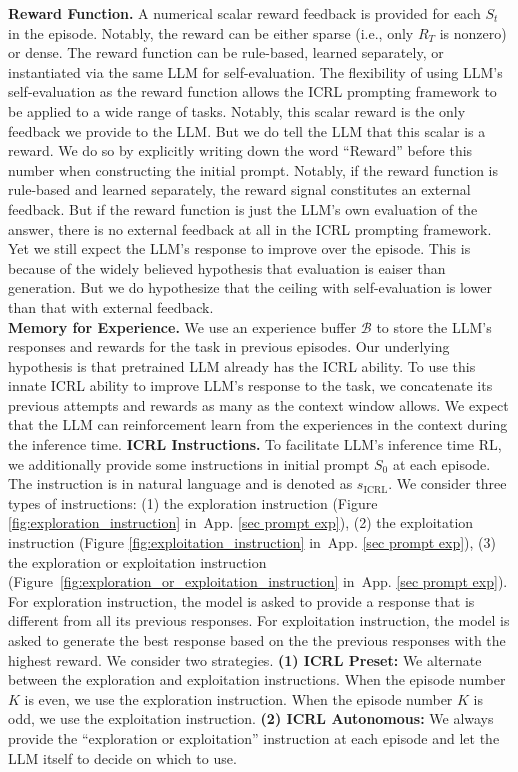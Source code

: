 \documentclass{article}
\newcommand{\fB}{\mathcal{B}}
\newcommand{\0}{\mathbf{0}}
\newcommand{\icrl}{\text{ICRL}}
\begin{document}
\textbf{Reward Function.} A numerical scalar reward feedback is provided for each $S_t$ in the episode.
Notably,
the reward can be either sparse (i.e., only $R_T$ is nonzero) or dense.
The reward function can be rule-based, learned separately, or instantiated via the same LLM for self-evaluation.
The flexibility of using LLM's self-evaluation as the reward function allows the ICRL prompting framework to be applied to a wide range of tasks.
Notably,
this scalar reward is the only feedback we provide to the LLM.
But we do tell the LLM that this scalar is a reward.
We do so by explicitly writing down the word ``Reward'' before this number when constructing the initial prompt.
Notably,
if the reward function is rule-based and learned separately,
the reward signal constitutes an external feedback.
But if the reward function is just the LLM's own evaluation of the answer,
there is no external feedback at all in the ICRL prompting framework.
Yet we still expect the LLM's response to improve over the episode.
This is because of the widely believed hypothesis that evaluation is eaiser than generation.
But we do hypothesize that the ceiling with self-evaluation is lower than that with external feedback. \\
\textbf{Memory for Experience.} We use an experience buffer $\fB$ to store the LLM's responses and rewards for the task in previous episodes.
Our underlying hypothesis is that pretrained LLM already has the ICRL ability.
To use this innate ICRL ability to improve LLM's response to the task,
we concatenate its previous attempts and rewards as many as the context window allows.
We expect that the LLM can reinforcement learn from the experiences in the context during the inference time.
\textbf{ICRL Instructions.}
To facilitate LLM's inference time RL, we additionally provide some instructions in initial prompt $S_0$ at each episode.
The instruction is in natural language and is denoted as $s_\icrl$.
We consider three types of instructions:
(1) the exploration instruction (Figure \ref{fig:exploration_instruction} in~App. \ref{sec prompt exp}),
(2) the exploitation instruction (Figure \ref{fig:exploitation_instruction} in~App. \ref{sec prompt exp}),
(3) the exploration or exploitation instruction (Figure~\ref{fig:exploration_or_exploitation_instruction} in~App. \ref{sec prompt exp}).
For exploration instruction,
the model is asked to provide a response that is different from all its previous responses.
For exploitation instruction, the model is asked to generate the best response based on the the previous responses with the highest reward.
We consider two strategies.
\textbf{(1) ICRL Preset:}
We alternate between the exploration and exploitation instructions.
When the episode number $K$ is even, we use the exploration instruction.
When the episode number $K$ is odd, we use the exploitation instruction.
\textbf{(2) ICRL Autonomous:} We always provide the ``exploration or exploitation'' instruction at each episode and let the LLM itself to decide on which to use.
\end{document}
